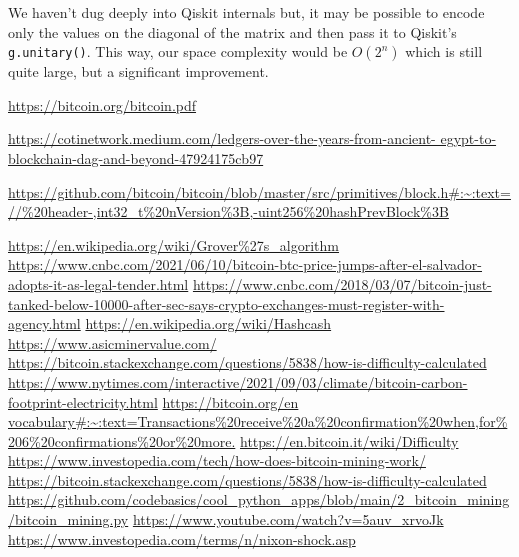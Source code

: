 \documentclass[11pt]{article} %
\begin{document}
\noindent We haven't dug deeply into Qiskit internals but, it may be possible to encode only the values on the diagonal of the matrix and then pass it to Qiskit's \lstinline{g.unitary()}. This way, our space complexity would be $O(2^n)$ which is still quite large, but a significant improvement.

\begin{thebibliography}{12}
\url{https://bitcoin.org/bitcoin.pdf}

 \url{https://cotinetwork.medium.com/ledgers-over-the-years-from-ancient-
egypt-to-blockchain-dag-and-beyond-47924175cb97}

 \url{https://github.com/bitcoin/bitcoin/blob/master/src/primitives/block.h#:~:text=//%20header-,int32_t%20nVersion%3B,-uint256%20hashPrevBlock%3B}

 \url{https://en.wikipedia.org/wiki/Grover%27s_algorithm}
  \url{https://www.cnbc.com/2021/06/10/bitcoin-btc-price-jumps-after-el-salvador-adopts-it-as-legal-tender.html}
 \url{https://www.cnbc.com/2018/03/07/bitcoin-just-tanked-below-10000-after-sec-says-crypto-exchanges-must-register-with-agency.html}
 \url{https://en.wikipedia.org/wiki/Hashcash}
 \url{https://www.asicminervalue.com/}
 \url{https://bitcoin.stackexchange.com/questions/5838/how-is-difficulty-calculated}
 \url{https://www.nytimes.com/interactive/2021/09/03/climate/bitcoin-carbon-footprint-electricity.html}
 \url{https://bitcoin.org/en vocabulary#:~:text=Transactions%20receive%20a%20confirmation%20when,for%206%20confirmations%20or%20more.}
 \url{https://en.bitcoin.it/wiki/Difficulty}
 \url{https://www.investopedia.com/tech/how-does-bitcoin-mining-work/}
 \url{https://bitcoin.stackexchange.com/questions/5838/how-is-difficulty-calculated}
 \url{https://github.com/codebasics/cool_python_apps/blob/main/2_bitcoin_mining/bitcoin_mining.py}
 \url{https://www.youtube.com/watch?v=5auv_xrvoJk}
 \url{https://www.investopedia.com/terms/n/nixon-shock.asp}
\end{thebibliography}
\end{document}
